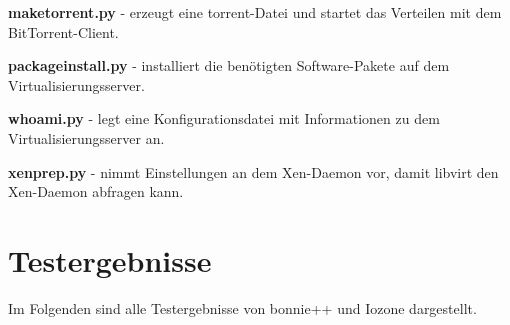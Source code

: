 \textbf{maketorrent.py}
- erzeugt eine torrent-Datei und startet das Verteilen mit dem BitTorrent-Client.

\textbf{packageinstall.py}
- installiert die benötigten Software-Pakete auf dem Virtualisierungsserver.

\textbf{whoami.py}
- legt eine Konfigurationsdatei mit Informationen zu dem Virtualisierungsserver an.

\textbf{xenprep.py}
- nimmt Einstellungen an dem Xen-Daemon vor, damit libvirt den Xen-Daemon abfragen kann.
\newpage
\section{Testergebnisse}
Im Folgenden sind alle Testergebnisse von bonnie++ und Iozone dargestellt.
\newpage

\begin{comment}
\section{Code-Listings}











\end{comment}